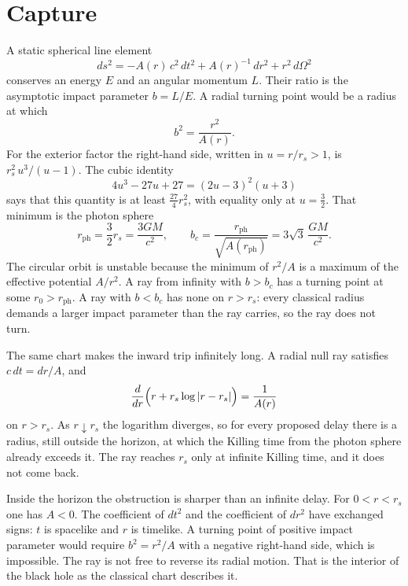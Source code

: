 \documentclass[a4paper]{article}
\begin{document}
\section{Capture}
\label{sec:capture}

A static spherical line element
\[
ds^2=-A(r)\,c^2\,dt^2+A(r)^{-1}\,dr^2+r^2\,d\Omega^2
\]
conserves an energy \(E\) and an angular momentum \(L\). Their ratio is the asymptotic impact parameter \(b=L/E\). A radial turning point would be a radius at which
\begin{equation}
\label{eq:turning}
b^2=\frac{r^2}{A(r)}.
\end{equation}
For the exterior factor the right-hand side, written in \(u=r/r_s>1\), is \(r_s^2\,u^3/(u-1)\). The cubic identity
\[
4u^3-27u+27=(2u-3)^2(u+3)
\]
says that this quantity is at least \(\frac{27}{4}r_s^2\), with equality only at \(u=\frac32\). That minimum is the photon sphere
\begin{equation}
\label{eq:photon-sphere}
r_{\mathrm{ph}}=\frac32 r_s=\frac{3GM}{c^2},
\qquad
b_c=\frac{r_{\mathrm{ph}}}{\sqrt{A(r_{\mathrm{ph}})}}=3\sqrt{3}\,\frac{GM}{c^2}.
\end{equation}
The circular orbit is unstable because the minimum of \(r^2/A\) is a maximum of the effective potential \(A/r^2\). A ray from infinity with \(b>b_c\) has a turning point at some \(r_0>r_{\mathrm{ph}}\). A ray with \(b<b_c\) has none on \(r>r_s\): every classical radius demands a larger impact parameter than the ray carries, so the ray does not turn.

The same chart makes the inward trip infinitely long. A radial null ray satisfies \(c\,dt=dr/A\), and
\begin{equation}
\label{eq:antideriv}
\frac{d}{dr}\Bigl(r+r_s\log|r-r_s|\Bigr)=\frac{1}{A(r)}
\end{equation}
on \(r>r_s\). As \(r\downarrow r_s\) the logarithm diverges, so for every proposed delay there is a radius, still outside the horizon, at which the Killing time from the photon sphere already exceeds it. The ray reaches \(r_s\) only at infinite Killing time, and it does not come back.

Inside the horizon the obstruction is sharper than an infinite delay. For \(0<r<r_s\) one has \(A<0\). The coefficient of \(dt^2\) and the coefficient of \(dr^2\) have exchanged signs: \(t\) is spacelike and \(r\) is timelike. A turning point of positive impact parameter would require \(b^2=r^2/A\) with a negative right-hand side, which is impossible. The ray is not free to reverse its radial motion. That is the interior of the black hole as the classical chart describes it.
\end{document}
